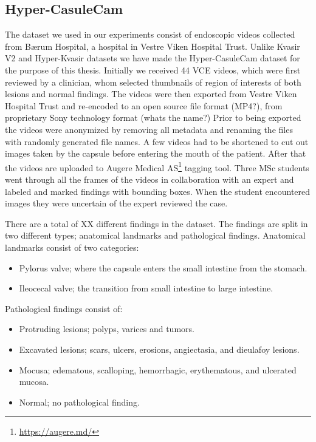 \documentclass[thesis.tex]{subfiles}
\begin{document}
\subsection{Hyper-CasuleCam} \label{sec:hyper-capsulecam}
The dataset we used in our experiments consist of endoscopic videos collected from Bærum Hospital, a hospital in Vestre Viken Hospital Trust. Unlike Kvasir V2 and Hyper-Kvasir datasets we have made the Hyper-CasuleCam dataset for the purpose of this thesis. Initially we received 44 VCE videos, which were first reviewed by a clinician, whom selected thumbnails of region of interests of both lesions and normal findings. The videos were then exported from Vestre Viken Hospital Trust and re-encoded to an open source file format (MP4?), from proprietary Sony technology format (whats the name?) %
Prior to being exported the videos were anonymized by removing all metadata and renaming the files with randomly generated file names. A few videos had to be shortened to cut out images taken by the capsule before entering the mouth of the patient. After that the videos are uploaded to Augere Medical AS\footnote{\url{https://augere.md/}} tagging tool. Three MSc students went through all the frames of the videos in collaboration with an expert and labeled and marked findings with bounding boxes. When the student encountered images they were uncertain of the expert reviewed the case.

There are a total of XX different findings in the dataset. The findings are split in two different types; anatomical landmarks and pathological findings. Anatomical landmarks consist of two categories:
\begin{itemize}
\item Pylorus valve; where the capsule enters the small intestine from the stomach.
\item Ileocecal valve; the transition from small intestine to large intestine. 
\end{itemize}

Pathological findings consist of:
\begin{itemize}
\item Protruding lesions; polyps, varices and tumors.
\item Excavated lesions; scars, ulcers, erosions, angiectasia, and dieulafoy lesions.
\item Mocusa; edematous, scalloping, hemorrhagic, erythematous, and ulcerated mucosa.
\item Normal; no pathological finding.
\end{itemize}
\end{document}
